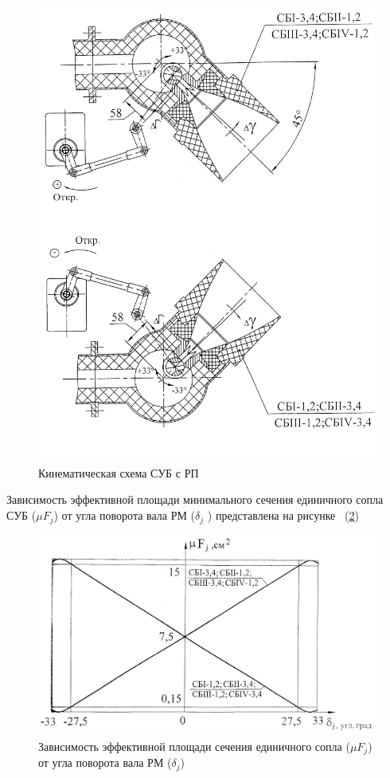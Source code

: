 \begin{figure}[h]
	\centering
	\includegraphics[scale=0.5]{images/scheme_subrp.jpg}
	\caption{Кинематическая схема СУБ с РП}
	\label{fig:scheme_subrp}
\end{figure}

Зависимость эффективной площади минимального сечения единичного сопла СУБ ($\mu F_j$) от угла поворота вала РМ ($\delta_j$ ) представлена на рисунке ~(\ref{fig:effect_nozzle})

\begin{figure}[h]
	\centering
	\includegraphics[scale=0.5]{images/effect_nozzle.jpg}
	\caption{Зависимость эффективной площади сечения единичного сопла ($\mu F_j$) от угла поворота вала РМ ($\delta_j$)}
	\label{fig:effect_nozzle}
\end{figure}

